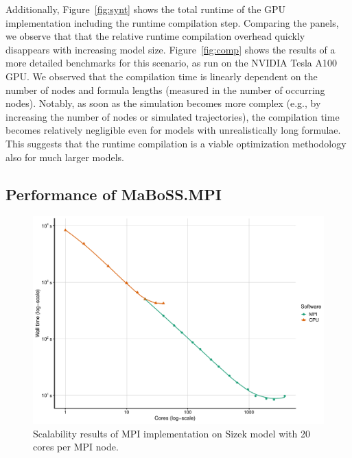\documentclass[a4paper,num-refs]{oup-contemporary}
\begin{document}
Additionally, Figure~\ref{fig:synt} shows the total runtime of the GPU implementation including the runtime compilation step. Comparing the panels, we observe that that the relative runtime compilation overhead quickly disappears with increasing model size. Figure~\ref{fig:comp} shows the results of a more detailed benchmarks for this scenario, as run on the NVIDIA Tesla A100 GPU. We observed that the compilation time is linearly dependent on the number of nodes and formula lengths (measured in the number of occurring nodes). Notably, as soon as the simulation becomes more complex (e.g., by increasing the number of nodes or simulated trajectories), the compilation time becomes relatively negligible even for models with unrealistically long formulae. This suggests that the runtime compilation is a viable optimization methodology also for much larger models.

\subsection{Performance of MaBoSS.MPI}


\begin{figure}%
\centering
\includegraphics[width=.8\linewidth]{Figures/sizek_mpi.pdf}
\caption{Scalability results of MPI implementation on Sizek model with 20 cores per MPI node.}
\label{fig:sizek_results}
\end{figure}
\end{document}
